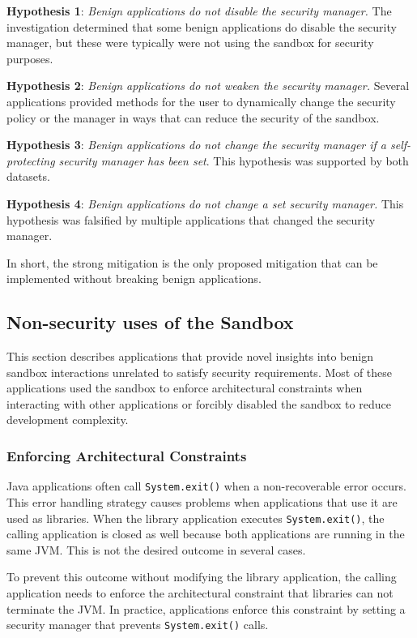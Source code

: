 \documentclass{sig-alternate}
\begin{document}
\textbf{Hypothesis 1}: \emph{Benign applications do not disable
the security manager.} The investigation determined
that some benign applications do disable the security manager, but these were typically were not using the sandbox for security purposes.

\textbf{Hypothesis 2}: \emph{Benign applications do not weaken the
security manager.} Several applications provided methods for the user to dynamically change the security policy or the manager in ways that can reduce the security of the sandbox.

\textbf{Hypothesis 3}: \emph{Benign applications do not change the
security manager if a self-protecting security manager has been set}.
This hypothesis was supported by both datasets.

\textbf{Hypothesis 4}: \emph{Benign applications do not change a
set security manager.} This hypothesis was falsified by multiple applications that changed the security manager.

In short, the strong mitigation is the only proposed mitigation that
can be implemented without breaking benign applications.

\subsection{Non-security uses of the Sandbox}\label{sub:Non-security-uses-of}

This section describes applications that provide novel insights into benign sandbox interactions unrelated to satisfy security
requirements. Most of these applications used the
sandbox to enforce architectural constraints when interacting with
other applications or forcibly disabled the sandbox to reduce development
complexity.

\subsubsection{Enforcing Architectural Constraints}

Java applications often call \texttt{System.exit()} when a non-recoverable
error occurs. This error handling strategy causes problems when applications that use it are used as libraries. When the library application executes \texttt{System.exit()},
the calling application is closed as well because both applications
are running in the same JVM. This is not the desired
outcome in several cases. 

To prevent this outcome without modifying the library application,
the calling application needs to enforce the architectural constraint
that libraries can not terminate the JVM. In practice, applications
enforce this constraint by setting a security manager
that prevents \texttt{System.exit()} calls.
\end{document}
